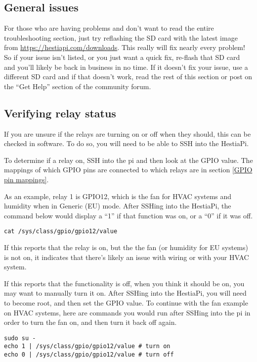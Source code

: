 \subsection{General issues}
For those who are having problems and don't want to read the entire
troubleshooting section, just try reflashing the SD card with the latest image
from \url{https://hestiapi.com/downloads}. This really will fix nearly every
problem! So if your issue isn't listed, or you just want a quick fix, re-flash
that SD card and you'll likely be back in business in no time. If it doesn't
fix your issue, use a different SD card and if that doesn't work, read the rest
of this section or post on the ``Get Help'' section of the community forum.

\subsection{Verifying relay status} \label{Verifying relay status}
If you are unsure if the relays are turning on or off when they should, this
can be checked in software. To do so, you will need to be able to SSH into the
HestiaPi.

To determine if a relay on, SSH into the pi and then look at the GPIO value.
The mappings of which GPIO pins are connected to which relays are in section
\ref{GPIO pin mappings}.

As an example, relay 1 is GPIO12, which is the fan for HVAC systems and
humidity when in Generic (EU) mode. After SSHing into the HestiaPi, the command
below would display a ``1'' if that function was on, or a ``0'' if it was off.

\texttt{cat /sys/class/gpio/gpio12/value}

If this reports that the relay is on, but the the fan (or humidity for EU
systems) is not on, it indicates that there's likely an issue with wiring or
with your HVAC system.

If this reports that the functionality is off, when you think it should be on,
you may want to manually turn it on. After SSHing into the HestiaPi, you will
need to become root, and then set the GPIO value. To continue with the fan
example on HVAC systems, here are commands you would run after SSHing into the
pi in order to turn the fan on, and then turn it back off again.

\texttt{sudo su -\\
echo 1 | /sys/class/gpio/gpio12/value \# turn on\\
echo 0 | /sys/class/gpio/gpio12/value \# turn off\\
}

